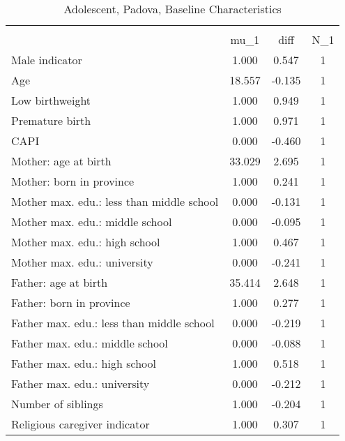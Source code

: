 \begin{table}[htbp]\centering
\def\sym#1{\ifmmode^{#1}\else\(^{#1}\)\fi}
\caption{Adolescent, Padova, Baseline Characteristics}
\begin{tabular}{l*{1}{ccc}}
\toprule
                    &\multicolumn{3}{c}{}                           \\
                    &        mu\_1         &        diff&         N\_1\\
\midrule
Male indicator      &       1.000         &       0.547&           1\\
Age                 &      18.557         &      -0.135&           1\\
Low birthweight     &       1.000         &       0.949&           1\\
Premature birth     &       1.000         &       0.971&           1\\
CAPI                &       0.000         &      -0.460&           1\\
Mother: age at birth&      33.029         &       2.695&           1\\
Mother: born in province&       1.000         &       0.241&           1\\
Mother max. edu.: less than middle school&       0.000         &      -0.131&           1\\
Mother max. edu.: middle school&       0.000         &      -0.095&           1\\
Mother max. edu.: high school&       1.000         &       0.467&           1\\
Mother max. edu.: university&       0.000         &      -0.241&           1\\
Father: age at birth&      35.414         &       2.648&           1\\
Father: born in province&       1.000         &       0.277&           1\\
Father max. edu.: less than middle school&       0.000         &      -0.219&           1\\
Father max. edu.: middle school&       0.000         &      -0.088&           1\\
Father max. edu.: high school&       1.000         &       0.518&           1\\
Father max. edu.: university&       0.000         &      -0.212&           1\\
Number of siblings  &       1.000         &      -0.204&           1\\
Religious caregiver indicator&       1.000         &       0.307&           1\\

\end{tabular}
\end{table}
